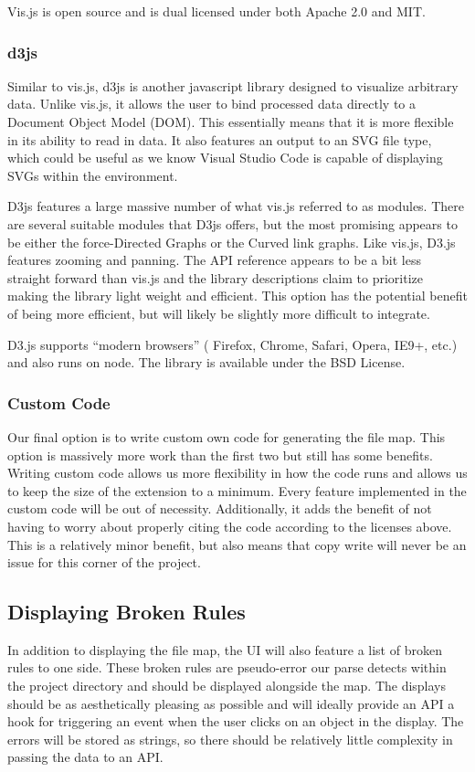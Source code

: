 \documentclass[letterpaper,10pt,titlepage,draftclsnofoot,onecolumn,onesided] {IEEEtran}
\begin{document}
Vis.js  is open source and is dual licensed under both Apache 2.0 and MIT.

\subsubsection{d3js}
Similar to vis.js, d3js is another javascript library designed to visualize arbitrary data. 
Unlike vis.js, it allows the user to bind processed data directly to a Document Object Model (DOM). 
This essentially means that it is more flexible in its ability to read in data. 
It also features an output to an SVG file type, which could be useful as we know Visual Studio Code is capable of displaying SVGs within the environment. 

D3js features a large massive number of what vis.js referred to as modules. 
There are several suitable modules that D3js offers, but the most promising appears to be either the force-Directed Graphs or the Curved link graphs. 
Like vis.js, D3.js features zooming and panning. 
The API reference appears to be a bit less straight forward than vis.js and the library descriptions claim to prioritize making the library light weight and efficient. 
This option has the potential benefit of being more efficient, but will likely be slightly more difficult to integrate.

D3.js supports ``modern browsers'' ( Firefox, Chrome, Safari, Opera, IE9+, etc.) and also runs on node. 
The library is available under the BSD License.


\subsubsection{Custom Code}
Our final option is to write custom own code for generating the file map. 
This option is massively more work than the first two but still has some benefits. 
Writing custom code allows us more flexibility in how the code runs and allows us to keep the size of the extension to a minimum. 
Every feature implemented in the custom code will be out of necessity. 
Additionally, it adds the benefit of not having to worry about properly citing the code according to the licenses above. 
This is a relatively minor benefit, but also means that copy write will never be an issue for this corner of the project.

\subsection{Displaying Broken Rules}
In addition to displaying the file map, the UI will also feature a list of broken rules to one side.
These broken rules are pseudo-error our parse detects within the project directory and should be displayed alongside the map. 
The displays should be as aesthetically pleasing as possible and will ideally provide an API a hook for triggering an event when the user clicks on an object in the display. 
The errors will be stored as strings, so there should be relatively little complexity in passing the data to an API. 
\end{document}
